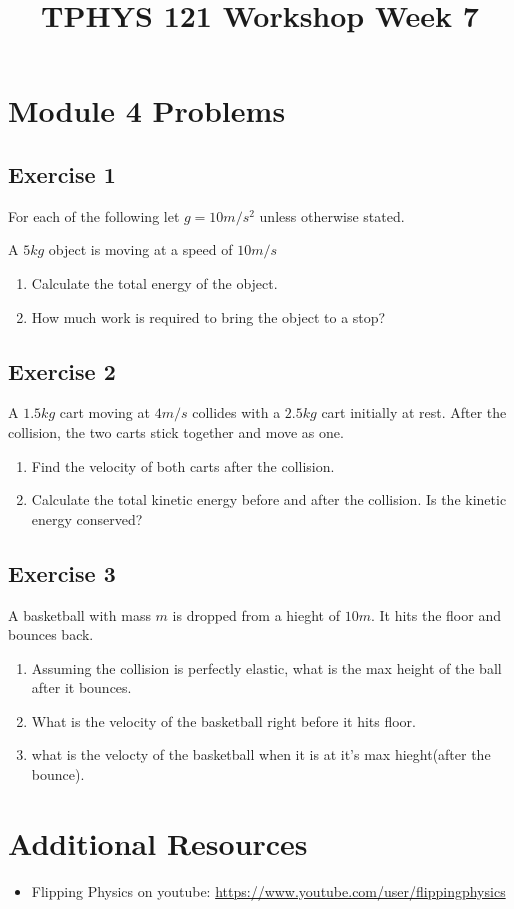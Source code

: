 \documentclass[11pt]{article}
\title{TPHYS 121 Workshop Week 7}
\author{}
\date{\vspace{-15ex}}
\newenvironment{exercise}{
    \begin{mdframed}[style=problemstyle]\textcolor{black}{}
}{
    \end{mdframed}
}
\begin{document}
\maketitle

\section*{Module 4 Problems}
\subsection*{Exercise 1}
For each of the following let $g=10m/s^2$ unless otherwise stated.
\begin{exercise}
    A $5kg$ object is moving at a speed of $10m/s$
    \begin{enumerate}[label=\alph*]
        \item Calculate the total energy of the object. 
        \item How much work is required to bring the object to a stop? 
    \end{enumerate}
\end{exercise}

\subsection*{Exercise 2}
\begin{exercise}
    A $1.5kg$ cart moving at $4m/s$ collides with a $2.5kg$ cart initially
    at rest. After the collision, the two carts stick together and move as 
    one. 
    \begin{enumerate}[label=\alph*]
        \item Find the velocity of both carts after the collision.
        \item Calculate the total kinetic energy before and after the
            collision. Is the kinetic energy conserved?
    \end{enumerate}
\end{exercise}

\subsection*{Exercise 3}
\begin{exercise}
    A basketball with mass $m$ is dropped from a hieght of $10m$. It hits
    the floor and bounces back.
    \begin{enumerate}
        \item Assuming the collision is perfectly elastic, what is the 
            max height of the ball after it bounces.
        \item What is the velocity of the basketball right before it hits 
            floor.
        \item what is the velocty of the basketball when it is at it's
            max hieght(after the bounce).
    \end{enumerate}
\end{exercise}


\section*{Additional Resources}
\begin{itemize}
    \item Flipping Physics on youtube: 
        \url{https://www.youtube.com/user/flippingphysics} 
\end{itemize}
\end{document}
